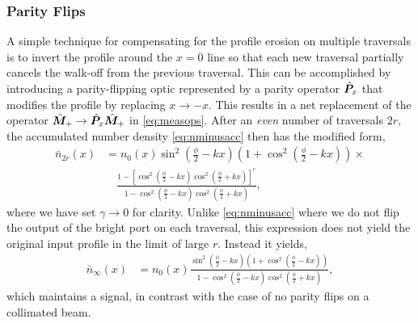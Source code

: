 \subsubsection{Parity Flips}\label{sec:parity}
A simple technique for compensating for the profile erosion on multiple traversals is to invert the profile around the $x=0$ line so that each new traversal partially cancels the walk-off from the previous traversal.  This can be accomplished by introducing a parity-flipping optic represented by a parity operator $\hat{\bm P}_x$ that modifies the profile by replacing $x \to -x$.  This results in a net replacement of the operator $\hat{\bm M}_+ \to \hat{\bm P}_x \hat{\bm M}_+$ in \eqref{eq:measops}.  After an \emph{even} number of traversals $2r$, the accumulated number density \eqref{eq:nminusacc} then has the modified form,
\begin{align}
  \bar{n}_{2r}(x) &= n_0(x) \sin^2\left(\frac{\phi}{2} -kx\right)\left(1+\cos^2\left(\frac{\phi}{2} - kx\right)\right)\times \nonumber \\
  &\quad \frac{1 - \left[\cos^2\left(\frac{\phi}{2} - kx\right)\cos^2\left(\frac{\phi}{2} + kx\right)\right]^r}{1 - \cos^2\left(\frac{\phi}{2} - kx\right)\cos^2\left(\frac{\phi}{2} + kx\right)}, 
\end{align} 
where we have set $\gamma \to 0$ for clarity.  Unlike \eqref{eq:nminusacc} where we do not flip the output of the bright port on each traversal, this expression does not yield the original input profile in the limit of large $r$.  Instead it yields,
\begin{align}
  \bar{n}_{\infty}(x) &= n_0(x) \frac{\sin^2\left(\frac{\phi}{2} -kx\right)\left(1+\cos^2\left(\frac{\phi}{2} - kx\right)\right)}{1 - \cos^2\left(\frac{\phi}{2} - kx\right)\cos^2\left(\frac{\phi}{2} + kx\right)}, 
\end{align} 
which maintains a signal, in contrast with the case of no parity flips on a collimated beam.  

